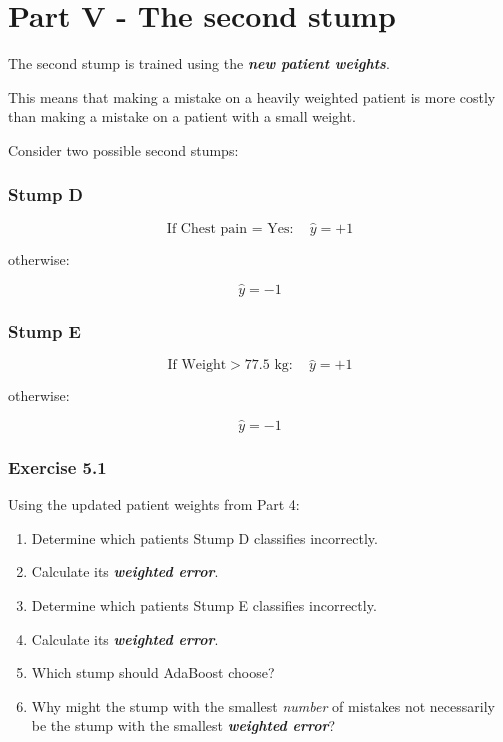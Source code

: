 \documentclass{course_sheet}
\begin{document}
\section*{Part V - The second stump}
The second stump is trained using the \textbf{\textit{new patient weights}}.

This means that making a mistake on a heavily weighted patient is more costly than making a mistake on a patient with a small weight.

Consider two possible second stumps:

\subsubsection*{Stump D}
\[
\text{If Chest pain = Yes}:
\quad \hat y=+1
\]

otherwise:

\[
\hat y=-1
\]

\subsubsection*{Stump E}
\[
\text{If Weight}>77.5\text{ kg}:
\quad \hat y=+1
\]

otherwise:

\[
\hat y=-1
\]

\subsubsection*{Exercise 5.1}
Using the updated patient weights from Part 4:

\begin{enumerate}
\item
Determine which patients Stump D classifies incorrectly.

\item
Calculate its \textbf{\textit{weighted error}}.

\item
Determine which patients Stump E classifies incorrectly.

\item
Calculate its \textbf{\textit{weighted error}}.

\item
Which stump should AdaBoost choose?

\item
Why might the stump with the smallest \emph{number} of mistakes not necessarily be the stump with the smallest \textbf{\textit{weighted error}}?

\end{enumerate}
\clearpage
\end{document}
